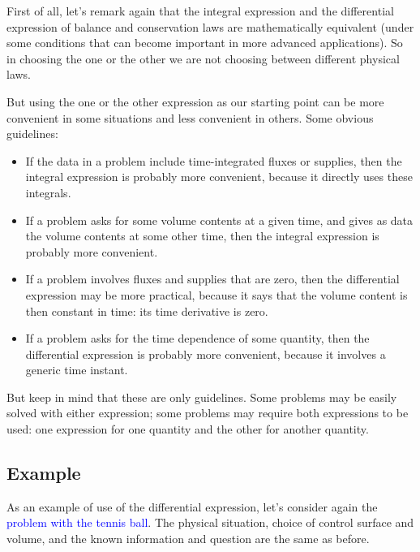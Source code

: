 \documentclass[a4paper,12pt,%
onecolumn,oneside,%
british%
]{memoir}
\renewcommand*{\|}[1][]{\nonscript\:#1\vert\nonscript\:\mathopen{}}
\newcommand*{\sect}{\S}%
\renewcommand*{\autoref}[2]{\sidepar{\vspace{-1ex}\footnotesize{\color{blue}\faIcon{%
angle-right%
}\enskip\sect~\ref{#1} page~\pageref{#1}}}\textcolor{blue}{#2}}
\begin{document}
First of all, let's remark again that the integral expression and the differential expression of balance and conservation laws are mathematically equivalent (under some conditions that can become important in more advanced applications). So in choosing the one or the other we are not choosing between different physical laws.

But using the one or the other expression as our starting point can be more convenient in some situations and less convenient in others. Some obvious guidelines:
\begin{itemize}
\item If the data in a problem include time-integrated fluxes or supplies, then the integral expression is probably more convenient, because it directly uses these integrals.
\item If a problem asks for some volume contents at a given time, and gives as data the volume contents at some other time, then the integral expression is probably more convenient.

  \smallskip

\item If a problem involves fluxes and supplies that are zero, then the differential expression may be more practical, because it says that the volume content is then constant in time: its time derivative is zero.
\item If a problem asks for the time dependence of some quantity, then the differential expression is probably more convenient, because it involves a generic time instant.
\end{itemize}
But keep in mind that these are only guidelines. Some problems may be easily solved with either expression; some problems may require both expressions to be used: one expression for one quantity and the other for another quantity.

\subsection{Example}
\label{sec:example_diff}

As an example of use of the differential expression, let's consider again the \autoref{sec:example_conservation_moving}{problem with the tennis ball}. The physical situation, choice of control surface and volume, and the known information and question are the same as before.
\end{document}
